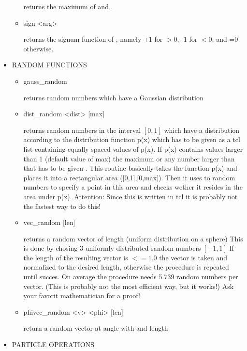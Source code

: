 \begin{itemize}
\begin{itemize}
\begin{code}
\end{code}
    returns the maximum of  and .
   \item
\begin{code}
sign <arg>
\end{code}
returns the signum-function of , namely +1 for 
$>0$, -1 for $<0$, and =0 otherwise.
  \end{itemize}
 \item
  RANDOM FUNCTIONS
  \begin{itemize}
   \item
\begin{code}
gauss\_random
\end{code}
returns random numbers which have a Gaussian distribution
   \item
\begin{code}
dist\_random <dist> [max]
\end{code}
returns random numbers in the interval $[0,1]$ which have a
distribution according to the distribution function p(x) 
which has to be given as a tcl list containing equally spaced values
of p(x). If p(x) contains values larger than 1 (default value of max)
the maximum or any number larger than that has to be given .
This routine basically takes the function p(x) and places it into a
rectangular area ([0,1],[0,max]). Then it uses to random numbers to
specify a point in this area and checks wether it resides in the area
under p(x). Attention: Since this is written in tcl it is probably not
the fastest way to do this!
   \item
\begin{code}
vec\_random [len]
\end{code}
returns a random vector of length  (uniform distribution on a
sphere) This is done by chosing 3 uniformly distributed random numbers
$[-1,1]$ If the length of the resulting vector is $<= 1.0$ the vector
is taken and normalized to the desired length, otherwise the procedure
is repeated until succes. On average the procedure needs 5.739 random
numbers per vector. (This is probably not the most efficient way, but
it works!) Ask your favorit mathematician for a proof!
   \item
\begin{code}
phivec\_random <v> <phi> [len]
\end{code}
    return a random vector at angle  with  and length 
  \end{itemize}
 \item
  PARTICLE OPERATIONS


\end{itemize}
